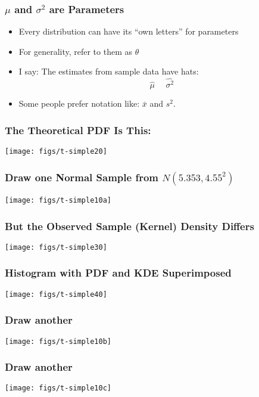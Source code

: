 \documentclass[10pt,english]{beamer}
\begin{document}
\begin{frame}
  \frametitle{$\mu$ and $\sigma^2$ are Parameters}
  \begin{itemize}
    \item Every distribution can have its ``own letters'' for parameters
    \item For generality, refer to them as $\theta$
    \item I say: The estimates from sample data have hats:
      \begin{displaymath}
        \hat{\mu}\ \ \ \ \ \ \widehat{\sigma^2}
      \end{displaymath}
    \item Some people prefer notation like:  $\bar{x}$ and $s^2$.
  \end{itemize}
\end{frame}


\begin{frame}[containsverbatim]
  \frametitle{The Theoretical PDF Is This:}

\texttt{[image: figs/t-simple20]}
\end{frame}



\begin{frame}[containsverbatim]
  \frametitle{Draw one Normal Sample from $N(5.353, 4.55^{2})$ }

\texttt{[image: figs/t-simple10a]}
\end{frame}



\begin{frame}[containsverbatim]
  \frametitle{But the Observed Sample (Kernel) Density Differs}

\texttt{[image: figs/t-simple30]}
\end{frame}

\begin{frame}[containsverbatim]
  \frametitle{Histogram with PDF and KDE Superimposed}

\texttt{[image: figs/t-simple40]}
\end{frame}


\begin{frame}[containsverbatim]
  \frametitle{Draw another}

\texttt{[image: figs/t-simple10b]}
\end{frame}



\begin{frame}[containsverbatim]
  \frametitle{Draw another}

\texttt{[image: figs/t-simple10c]}
\end{frame}
\end{document}

